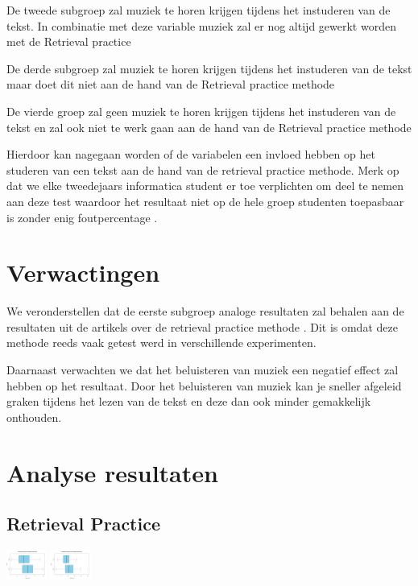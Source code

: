 \documentclass{hogent-article}
\begin{document}
	De tweede subgroep zal muziek te horen krijgen tijdens het instuderen van de tekst. In combinatie met deze variable muziek zal er nog altijd gewerkt worden met de Retrieval practice
	
	De derde subgroep zal muziek te horen krijgen tijdens het instuderen van de tekst maar doet dit niet aan de hand van de Retrieval practice methode
	
	De vierde groep zal geen muziek te horen krijgen tijdens het instuderen van de tekst en zal ook niet te werk gaan aan de hand van de Retrieval practice methode
	
	Hierdoor kan nagegaan worden of de variabelen een invloed hebben op het studeren van een tekst aan de hand van de retrieval practice methode. Merk op dat we elke tweedejaars informatica student er toe verplichten om deel te nemen aan deze test waardoor het resultaat niet op de hele groep studenten toepasbaar is zonder enig foutpercentage \autocite{karpicke2009metacognitive}.
	
	\section{Verwactingen}
	We veronderstellen dat de eerste subgroep analoge resultaten zal behalen aan de resultaten uit de artikels over de retrieval practice methode \autocite{butler2010repeated, pyc2012test, karpicke2007repeated, karpicke2008critical}. Dit is omdat deze methode reeds vaak getest werd in verschillende experimenten.
	
	Daarnaast verwachten we dat het beluisteren van muziek een negatief effect zal hebben op het resultaat. Door het beluisteren van muziek kan je sneller afgeleid graken tijdens het lezen van de tekst en deze dan ook minder gemakkelijk onthouden.
	
	\section{Analyse resultaten}
	\subsection{Retrieval Practice}	
	\includegraphics[width=50px]{Rplot_MetRetrievalPractice}
	\includegraphics[width=50px]{Rplot_ZonderRetrievalPractice}
	
\end{document}
